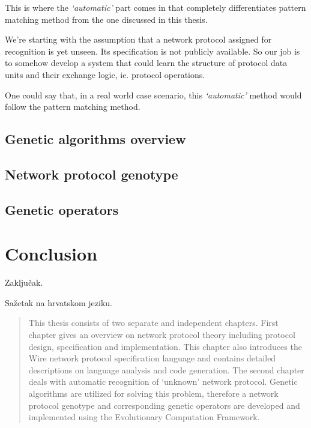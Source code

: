 \documentclass[times, utf8, diplomski]{fer}
\begin{document}
This is where the \emph{`automatic'} part comes in that completely differentiates
pattern matching method from the one discussed in this thesis.

We're starting with the assumption that a network protocol assigned for recognition
is yet unseen. Its specification is not publicly available. So our job is to somehow 
develop a system that could learn the structure of protocol data units and their 
exchange logic, ie. protocol operations.

One could say that, in a real world case scenario, this \emph{`automatic'} method 
would follow the pattern matching method.

\section{Genetic algorithms overview}
\section{Network protocol genotype}
\section{Genetic operators}
\section{}

\chapter{Conclusion}
Zaključak.




\begin{sazetak}
Sažetak na hrvatskom jeziku.

\end{sazetak}

\begin{abstract}
This thesis consists of two separate and independent chapters. First chapter gives
an overview on network protocol theory including protocol design, specification
and implementation. This chapter also introduces the Wire network protocol 
specification language and contains detailed descriptions on language analysis
and code generation. The second chapter deals with automatic recognition of
`unknown' network protocol. Genetic algorithms are utilized for solving this
problem, therefore a network protocol genotype and corresponding genetic operators 
are developed and implemented using the Evolutionary Computation Framework.

\end{abstract}
\end{document}

